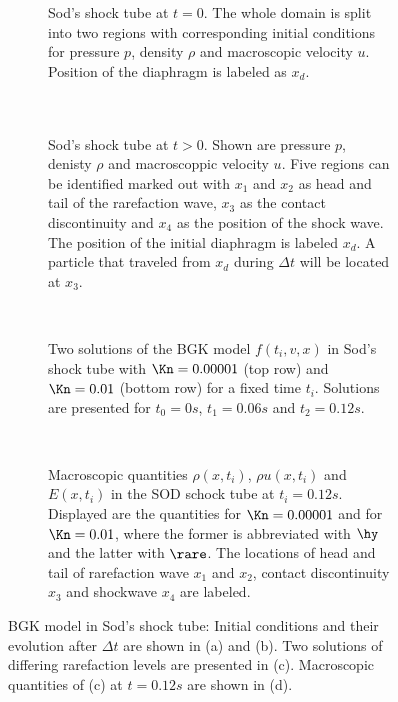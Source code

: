 \begin{figure}[H]
	\begin{subfigure}{.45\textwidth}
		\centering
		
		\caption{Sod's shock tube at \(t=0\). The whole domain is split into two regions with corresponding initial conditions for pressure \(p\), density \(\rho\) and macroscopic velocity \(u\). Position of the diaphragm is labeled as \(x_d\).\\ \\ \\}
		\label{Fig:SodTime}
	\end{subfigure}\hfill
	\begin{subfigure}{.45\textwidth}
		\centering
		
		\caption{Sod's shock tube at \(t>0\). Shown are pressure \(p\), denisty \(\rho\)  and macroscoppic velocity \(u\). Five regions can be identified marked out with \(x_1\) and \(x_2\) as head and tail of the rarefaction wave, \(x_3\) as the contact discontinuity and \(x_4\) as the position of the shock wave. The position of the initial diaphragm is labeled \(x_d\). A particle that traveled from \(x_d\) during \(\Delta t\) will be located at \(x_3\).}
		\label{Fig:SodTime0}
	\end{subfigure}\\ \vfill
	\begin{subfigure}{\textwidth}
		\centering
		
		\vspace{-10pt}
		\caption{Two solutions of the BGK model \(f(t_i,v,x)\) in Sod's shock tube with \(\Kn=0.00001\) (top row) and \(\Kn=0.01\) (bottom row) for a fixed time \(t_i\). Solutions are presented for \(t_0=0s\), \(t_1=0.06s\) and \(t_2=0.12s\).}
		\label{Fig:ExamplesSod}
	\end{subfigure}\\%
	\begin{subfigure}{\textwidth}
		
		\caption{Macroscopic quantities \(\rho(x,t_i)\), \(\rho u(x,t_i)\) and \(E(x,t_i)\) in the SOD schock tube at \(t_i=0.12s\). Displayed are the quantities for \(\Kn=0.00001\) and for \(\Kn=0.01\), where the former is abbreviated with \(\hy\) and the latter with \(\rare\). The locations of head and tail of rarefaction wave \(x_1\) and \(x_2\), contact discontinuity \(x_3\) and shockwave \(x_4\) are labeled.}
		\label{Fig:SODHyRare}
	\end{subfigure}\caption{BGK model in Sod's shock tube: Initial conditions and their evolution after \(\Delta t\) are shown in (a) and (b). Two solutions of differing rarefaction levels are presented in (c). Macroscopic quantities of (c) at \(t=0.12s\) are shown in (d).}
	\label{Fig:Sod}
\end{figure}

